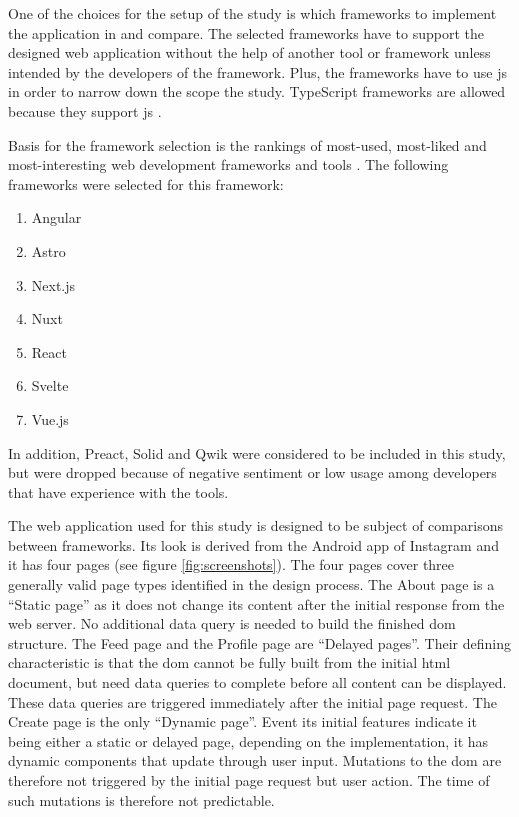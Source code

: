 \documentclass[a4paper, 12pt]{article}
\begin{document}
One of the choices for the setup of the study is which frameworks to implement the application in and compare.
The selected frameworks have to support the designed web application without the help of another tool or framework unless intended by the developers of the framework.
Plus, the frameworks have to use \acrfull{js}  in order to narrow down the scope the study.
TypeScript frameworks are allowed because they support \acrshort{js} \citep{typescript}.

Basis for the framework selection is the rankings of most-used, most-liked and most-interesting web development frameworks and tools \citep{stateOfJs2023}.
The following frameworks were selected for this framework:

\begin{enumerate}
  \item Angular
  \item Astro
  \item Next.js
  \item Nuxt
  \item React
  \item Svelte
  \item Vue.js
\end{enumerate}

In addition, Preact, Solid and Qwik were considered to be included in this study, but were dropped because of negative sentiment or low usage among developers that have experience with the tools.

The web application used for this study is designed to be subject of comparisons between frameworks.
Its look is derived from the Android app of Instagram \citep{instagram} and it has four pages (see figure \ref{fig:screenshots}).
The four pages cover three generally valid page types identified in the design process.
The About page is a \enquote{Static page} as it does not change its content after the initial response from the web server.
No additional data query is needed to build the finished \acrshort{dom} structure.
The Feed page and the Profile page are \enquote{Delayed pages}.
Their defining characteristic is that the \acrshort{dom} cannot be fully built from the initial \acrshort{html} document, but need data queries to complete before all content can be displayed.
These data queries are triggered immediately after the initial page request.
The Create page is the only \enquote{Dynamic page}.
Event its initial features indicate it being either a static or delayed page, depending on the implementation, it has dynamic components that update through user input.
Mutations to the \acrshort{dom} are therefore not triggered by the initial page request but user action.
The time of such mutations is therefore not predictable.
\end{document}
